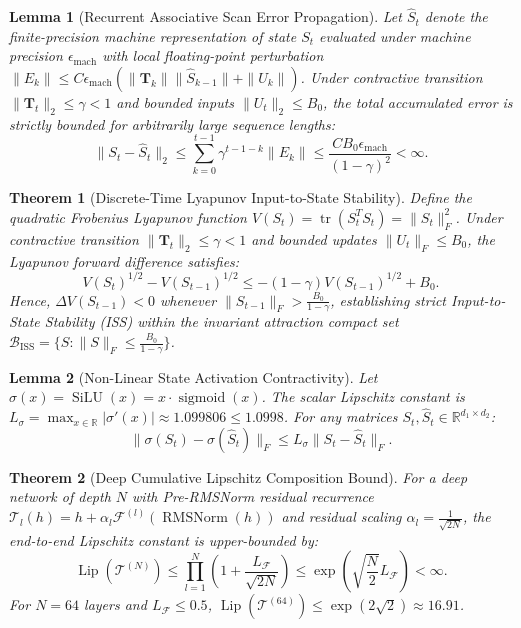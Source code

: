\documentclass[journal]{IEEEtran}
\newtheorem{theorem}{Theorem}
\newtheorem{lemma}{Lemma}
\begin{document}
\begin{lemma}[Recurrent Associative Scan Error Propagation]
Let $\hat{S}_t$ denote the finite-precision machine representation of state $S_t$ evaluated under machine precision $\epsilon_{\text{mach}}$ with local floating-point perturbation $\|E_k\| \le C \epsilon_{\text{mach}} (\|\mathbf{T}_k\| \|\hat{S}_{k-1}\| + \|U_k\|)$. Under contractive transition $\|\mathbf{T}_t\|_2 \le \gamma < 1$ and bounded inputs $\|U_t\|_2 \le B_0$, the total accumulated error is strictly bounded for arbitrarily large sequence lengths:
\begin{equation}
\|S_t - \hat{S}_t\|_2 \le \sum_{k=0}^{t-1} \gamma^{t-1-k} \|E_k\| \le \frac{C B_0 \epsilon_{\text{mach}}}{(1 - \gamma)^2} < \infty.
\end{equation}
\end{lemma}

\begin{theorem}[Discrete-Time Lyapunov Input-to-State Stability]
Define the quadratic Frobenius Lyapunov function $V(S_t) = \operatorname{tr}(S_t^T S_t) = \|S_t\|_F^2$. Under contractive transition $\|\mathbf{T}_t\|_2 \le \gamma < 1$ and bounded updates $\|U_t\|_F \le B_0$, the Lyapunov forward difference satisfies:
\begin{equation}
V(S_t)^{1/2} - V(S_{t-1})^{1/2} \le -(1 - \gamma) V(S_{t-1})^{1/2} + B_0.
\end{equation}
Hence, $\Delta V(S_{t-1}) < 0$ whenever $\|S_{t-1}\|_F > \frac{B_0}{1 - \gamma}$, establishing strict Input-to-State Stability (ISS) within the invariant attraction compact set $\mathcal{B}_{\text{ISS}} = \{ S : \|S\|_F \le \frac{B_0}{1 - \gamma} \}$.
\end{theorem}

\begin{lemma}[Non-Linear State Activation Contractivity]
Let $\sigma(x) = \operatorname{SiLU}(x) = x \cdot \operatorname{sigmoid}(x)$. The scalar Lipschitz constant is $L_\sigma = \max_{x \in \mathbb{R}} |\sigma'(x)| \approx 1.099806 \le 1.0998$. For any matrices $S_t, \hat{S}_t \in \mathbb{R}^{d_1 \times d_2}$:
\begin{equation}
\|\sigma(S_t) - \sigma(\hat{S}_t)\|_F \le L_\sigma \|S_t - \hat{S}_t\|_F.
\end{equation}
\end{lemma}

\begin{theorem}[Deep Cumulative Lipschitz Composition Bound]
For a deep network of depth $N$ with Pre-RMSNorm residual recurrence $\mathcal{T}_l(h) = h + \alpha_l \mathcal{F}^{(l)}(\operatorname{RMSNorm}(h))$ and residual scaling $\alpha_l = \frac{1}{\sqrt{2N}}$, the end-to-end Lipschitz constant is upper-bounded by:
\begin{equation}
\operatorname{Lip}(\mathcal{T}^{(N)}) \le \prod_{l=1}^N \left( 1 + \frac{L_\mathcal{F}}{\sqrt{2N}} \right) \le \exp\left( \sqrt{\frac{N}{2}} L_\mathcal{F} \right) < \infty.
\end{equation}
For $N=64$ layers and $L_\mathcal{F} \le 0.5$, $\operatorname{Lip}(\mathcal{T}^{(64)}) \le \exp(2\sqrt{2}) \approx 16.91$.
\end{theorem}
\end{document}
